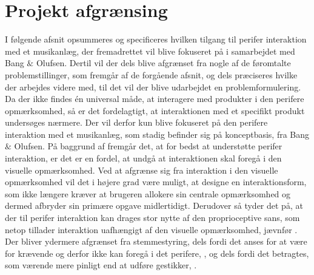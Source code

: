 \section{Projekt afgrænsing}
\label{Afgraensning}
%
I følgende afsnit opsummeres og specificeres hvilken tilgang til perifer interaktion med et musikanlæg, der fremadrettet vil blive fokuseret på i samarbejdet med Bang $\&$ Olufsen. Dertil vil der dels blive afgrænset fra nogle af de føromtalte problemstillinger, som fremgår af de forgående afsnit, og dels præciseres hvilke der arbejdes videre med, til det vil der blive udarbejdet en problemformulering.\blankline
% 
Da der ikke findes én universal måde, at interagere med produkter i den perifere opmærksomhed, så er det fordelagtigt, at interaktionen med et specifikt produkt undersøges nærmere. Der vil derfor kun blive fokuseret på den perifere interaktion med et musikanlæg, som stadig befinder sig på konceptbasis, fra Bang $\&$ Olufsen. På baggrund af  fremgår det, at for bedst at understøtte perifer interaktion, er det er en fordel, at undgå at interaktionen skal foregå i den visuelle opmærksomhed. Ved at afgrænse sig fra interaktion i den visuelle opmærksomhed vil det i højere grad være muligt, at designe en interaktionsform, som ikke længere kræver at brugeren allokere sin centrale opmærksomhed og dermed afbryder sin primære opgave midlertidigt. Derudover så tyder det på, at der til perifer interaktion kan drages stor nytte af den proprioceptive sans, som netop tillader interaktion uafhængigt af den visuelle opmærksomhed, jævnfør . Der bliver ydermere afgrænset fra stemmestyring, dels fordi det anses for at være for krævende og derfor ikke kan foregå i det perifere, \parencite[s. 41]{PDF:PIEmbeddingHCIMicroManageMe}, og dels fordi det betragtes, som værende mere pinligt end at udføre gestikker, \parencite[s. 4]{PDF:AnExploratoryStudy}.        

